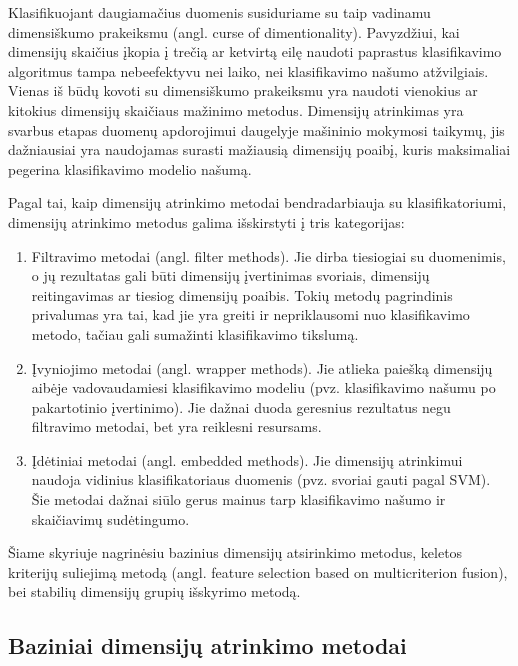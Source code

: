 Klasifikuojant daugiamačius duomenis susiduriame su taip vadinamu dimensiškumo
prakeiksmu (angl. curse of dimentionality). Pavyzdžiui, kai dimensijų skaičius įkopia į
trečią ar ketvirtą eilę naudoti paprastus klasifikavimo algoritmus tampa
nebeefektyvu nei laiko, nei klasifikavimo našumo atžvilgiais. Vienas iš būdų
kovoti su dimensiškumo prakeiksmu
yra naudoti vienokius ar kitokius dimensijų skaičiaus mažinimo metodus. 
Dimensijų atrinkimas yra svarbus etapas duomenų apdorojimui daugelyje mašininio
mokymosi taikymų, jis dažniausiai yra naudojamas surasti mažiausią dimensijų
poaibį, kuris maksimaliai pegerina klasifikavimo modelio našumą.

Pagal tai, kaip dimensijų atrinkimo metodai bendradarbiauja su klasifikatoriumi,
dimensijų atrinkimo metodus galima išskirstyti į tris kategorijas:
\begin{enumerate}
 \item Filtravimo metodai (angl. filter methods). Jie dirba tiesiogiai su
 duomenimis, o jų rezultatas gali būti dimensijų įvertinimas svoriais, 
 dimensijų reitingavimas ar tiesiog dimensijų poaibis. Tokių metodų pagrindinis
 privalumas yra tai, kad jie yra greiti ir nepriklausomi nuo klasifikavimo
 metodo, tačiau gali sumažinti klasifikavimo tikslumą.
 \item Įvyniojimo metodai (angl. wrapper methods). Jie atlieka paiešką 
 dimensijų aibėje vadovaudamiesi klasifikavimo modeliu (pvz. klasifikavimo
 našumu po pakartotinio įvertinimo). Jie dažnai duoda geresnius rezultatus 
 negu filtravimo metodai, bet yra reiklesni resursams.
 \item Įdėtiniai metodai (angl. embedded methods). Jie dimensijų atrinkimui
 naudoja vidinius klasifikatoriaus duomenis (pvz. svoriai gauti pagal SVM).
 Šie metodai dažnai siūlo gerus mainus tarp klasifikavimo našumo ir 
 skaičiavimų sudėtingumo.
\end{enumerate}

Šiame skyriuje nagrinėsiu bazinius dimensijų atsirinkimo metodus, keletos 
kriterijų suliejimą metodą (angl.
feature selection based on multicriterion fusion)\cite{yang2011robust}, bei
stabilių dimensijų grupių išskyrimo metodą\cite{Loscalzo:2009:CGS:1557019.1557084}.

\subsection{Baziniai dimensijų atrinkimo metodai}

